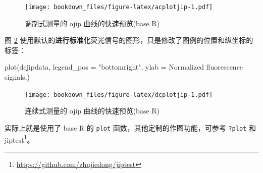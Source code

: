 \documentclass[
]{krantz}
\makeatletter
\newenvironment{Shaded}{\begin{snugshade}}{\end{snugshade}}
\newcommand{\AttributeTok}[1]{\textcolor[rgb]{0.77,0.63,0.00}{#1}}
\newcommand{\ConstantTok}[1]{\textcolor[rgb]{0.00,0.00,0.00}{#1}}
\newcommand{\DecValTok}[1]{\textcolor[rgb]{0.00,0.00,0.81}{#1}}
\newcommand{\FloatTok}[1]{\textcolor[rgb]{0.00,0.00,0.81}{#1}}
\newcommand{\FunctionTok}[1]{\textcolor[rgb]{0.00,0.00,0.00}{#1}}
\newcommand{\NormalTok}[1]{#1}
\newcommand{\SpecialCharTok}[1]{\textcolor[rgb]{0.00,0.00,0.00}{#1}}
\newcommand{\StringTok}[1]{\textcolor[rgb]{0.31,0.60,0.02}{#1}}
\renewcommand{\href}[2]{#2\footnote{\url{#1}}}
\newenvironment{kframe}{%
\medskip{}
\setlength{\fboxsep}{.8em}
 \def\at@end@of@kframe{}%
 \ifinner\ifhmode%
  \def\at@end@of@kframe{\end{minipage}}%
  \begin{minipage}{\columnwidth}%
 \fi\fi%
 \def\FrameCommand##1{\hskip\@totalleftmargin \hskip-\fboxsep
 \colorbox{shadecolor}{##1}\hskip-\fboxsep
     \hskip-\linewidth \hskip-\@totalleftmargin \hskip\columnwidth}%
 \MakeFramed {\advance\hsize-\width
   \@totalleftmargin\z@ \linewidth\hsize
   \@setminipage}}%
 {\par\unskip\endMakeFramed%
 \at@end@of@kframe}
\renewenvironment{Shaded}{\begin{kframe}}{\end{kframe}}
\makeatother
\begin{document}
\begin{Shaded}
\end{Shaded}

\begin{figure}
\centering
\texttt{[image: bookdown\_files/figure-latex/acplotjip-1.pdf]}
\caption{\label{fig:acplotjip}调制式测量的 ojip 曲线的快速预览(base R)}
\end{figure}

图 \ref{fig:dcplotjip} 使用默认的\textbf{进行标准化}荧光信号的图形，只是修改了图例的位置和纵坐标的标签：

\begin{Shaded}
\begin{Highlighting}[]
\FunctionTok{plot}\NormalTok{(dcjipdata, }\AttributeTok{legend\_pos =} \StringTok{"bottomright"}\NormalTok{, }\AttributeTok{ylab =} \StringTok{\textquotesingle{}Normalized fluorescence signals\textquotesingle{}}\NormalTok{,)}
\end{Highlighting}
\end{Shaded}

\begin{figure}
\centering
\texttt{[image: bookdown\_files/figure-latex/dcplotjip-1.pdf]}
\caption{\label{fig:dcplotjip}连续式测量的 ojip 曲线的快速预览(base R)}
\end{figure}

实际上就是使用了 base R 的 \texttt{plot} 函数，其他定制的作图功能，可参考 \texttt{?plot} 和 \href{https://github.com/zhujiedong/jiptest}{jiptest}。
\end{document}
